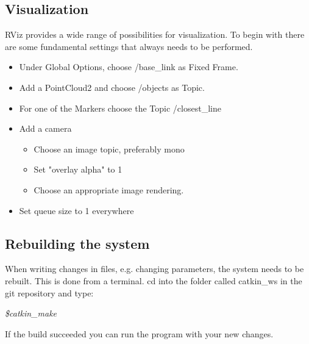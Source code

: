 \documentclass[10pt,a4paper]{article}
\begin{document}
\subsection{Visualization}
RViz provides a wide range of possibilities for visualization.
To begin with there are some fundamental settings that always needs to be performed.
\begin{itemize}

\item Under Global Options, choose /base\_link as Fixed Frame.

\item Add a PointCloud2 and choose /objects as Topic.

\item For one of the Markers choose the Topic /closest\_line

\item Add a camera
\begin{itemize}
\item Choose an image topic, preferably mono 
\item Set "overlay alpha" to 1
\item Choose an appropriate image rendering.
\end{itemize} 
\item Set queue size to 1 everywhere
\end{itemize}

\subsection{Rebuilding the system}
When writing changes in files, e.g. changing parameters, the system needs to be rebuilt. This is done from a terminal. cd into the folder called catkin\_ws in the git repository and type:


\textit{\$catkin\_make}

\noindent If the build succeeded you can run the program with your new changes.
\end{document}
